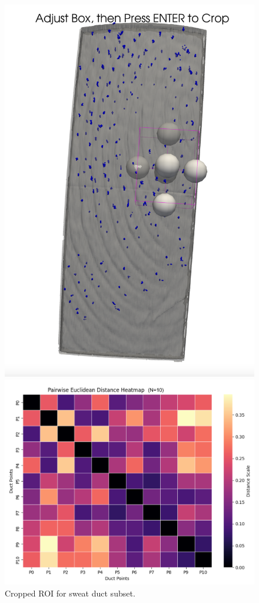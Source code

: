 \documentclass[12pt, twoside]{report}
\begin{document}
\begin{figure}[htp]
    \centering
    \begin{minipage}{0.39\textwidth}
        \centering
        \includegraphics[width=\textwidth]{images/cropped_ROI.png}
        \caption{Cropped ROI for sweat duct subset.}
        \label{fig:additional_figure_1}
    \end{minipage}
    \hfill
    \begin{minipage}{0.41\textwidth}
        \centering
        \includegraphics[width=\textwidth]{images/croppedSD-pairwise-heatmap.png}

\end{minipage}
\end{figure}
\end{document}
